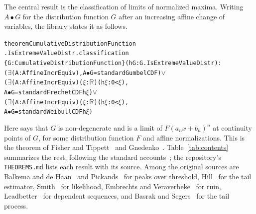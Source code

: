 \documentclass[11pt]{article}
\newcommand{\lean}[1]{\texttt{\detokenize{#1}}}
\begin{document}
The central result is the classification of limits of normalized maxima. Writing
$A\bullet G$ for the distribution function $G$ after an increasing affine change of variables, the
library states it as follows.
\begin{alltt}\small
theorem CumulativeDistributionFunction
    .IsExtremeValueDistr.classification
    \{G : CumulativeDistributionFunction\} (hG : G.IsExtremeValueDistr) :
    (\(\exists\) (A : AffineIncrEquiv), A \(\bullet\) G = standardGumbelCDF) \(\lor\)
      (\(\exists\) (A : AffineIncrEquiv) (\(\xi\) : \(\mathbb{R}\)) (h\(\xi\) : 0 < \(\xi\)),
        A \(\bullet\) G = standardFrechetCDF h\(\xi\)) \(\lor\)
      (\(\exists\) (A : AffineIncrEquiv) (\(\xi\) : \(\mathbb{R}\)) (h\(\xi\) : 0 < \(\xi\)),
        A \(\bullet\) G = standardWeibullCDF h\(\xi\))
\end{alltt}
Here \lean{G.IsExtremeValueDistr} says that $G$ is non-degenerate and is a limit of $F(a_n x + b_n)^n$
at continuity points of $G$, for some distribution function $F$ and affine normalizations.
This is the theorem of Fisher and Tippett~\cite{ft} and Gnedenko~\cite{gnedenko}. Table~\ref{tab:contents} summarizes the rest, following the standard
accounts~\cite{ekm,dhf,bgt,resnick,llr,coles}; the repository's \texttt{THEOREMS.md} lists each result with its source. Among the original sources are Balkema and de Haan~\cite{balkema} and
Pickands~\cite{pickands} for peaks over threshold, Hill~\cite{hill} for the tail estimator, Smith~\cite{smith} for likelihood, Embrechts and Veraverbeke~\cite{ev} for ruin, Leadbetter~\cite{leadbetter} for dependent sequences, and
Basrak and Segers~\cite{bs} for the tail process.
\end{document}
